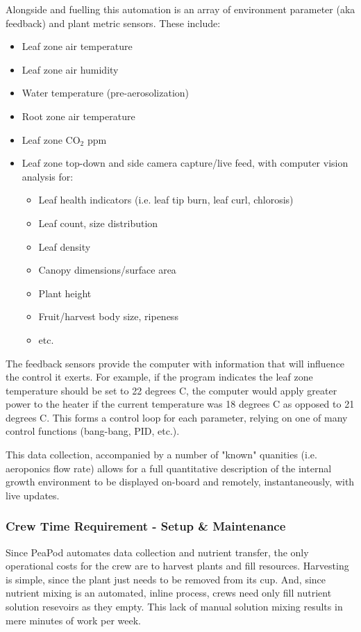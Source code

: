 \documentclass{report}
\begin{document}
Alongside and fuelling this automation is an array of environment parameter (aka feedback) and plant metric sensors. These include:
\begin{itemize}
    \item Leaf zone air temperature
    \item Leaf zone air humidity
    \item Water temperature (pre-aerosolization)
    \item Root zone air temperature
    \item Leaf zone CO${}_2$ ppm
    \item Leaf zone top-down and side camera capture/live feed, with computer vision analysis for:
    \begin{itemize}
        \item Leaf health indicators (i.e. leaf tip burn, leaf curl, chlorosis)
        \item Leaf count, size distribution
        \item Leaf density
        \item Canopy dimensions/surface area
        \item Plant height
        \item Fruit/harvest body size, ripeness
        \item etc.
    \end{itemize}
\end{itemize}

The feedback sensors provide the computer with information that will influence the control it exerts. For example, if the program indicates the leaf zone temperature should be set to 22 degrees C, the computer would apply greater power to the heater if the current temperature was 18 degrees C as opposed to 21 degrees C. This forms a control loop for each parameter, relying on one of many control functions (bang-bang, PID, etc.).

This data collection, accompanied by a number of "known" quanities (i.e. aeroponics flow rate) allows for a full quantitative description of the internal growth environment to be displayed on-board and remotely, instantaneously, with live updates.


\subsubsection{Crew Time Requirement - Setup \& Maintenance}
\label{sec:constraints-crewtime} 
Since PeaPod automates data collection and nutrient transfer, the only operational costs for the crew are to harvest plants and fill resources. Harvesting is simple, since the plant just needs to be removed from its cup. And, since nutrient mixing is an automated, inline process, crews need only fill nutrient solution resevoirs as they empty. This lack of manual solution mixing results in mere minutes of work per week.
\end{document}
